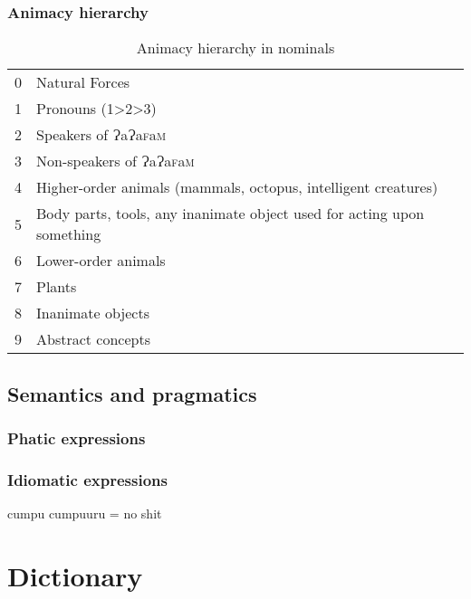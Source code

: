 \documentclass[a4paper,10pt,twoside,openright,draft]{memoir}
\newcommand{\lang}{ɁaɁa\textsc{f}a\textsc{m}}
\begin{document}
\section{Animacy hierarchy}

\begin{table}[ht]
    \centering
    \begin{tabular}{ll}
    0 & Natural Forces \\
    1 & Pronouns (1>2>3) \\
    2 & Speakers of \lang{} \\
    3 & Non-speakers of \lang{} \\
    4 & Higher-order animals (mammals, octopus, intelligent creatures) \\
    5 & \parbox[t]{7cm}{Body parts, tools, any inanimate object used for acting upon something} \\
    6 & Lower-order animals \\
    7 & Plants \\
    8 & Inanimate objects \\
    9 & Abstract concepts 
    \end{tabular}
    \caption{Animacy hierarchy in nominals}
    \label{tab:hierarchy}
\end{table}

\chapter{Semantics and pragmatics}
\section{Phatic expressions}
\section{Idiomatic expressions}

cumpu cumpuuru = no shit

\part{Dictionary}
\end{document}
